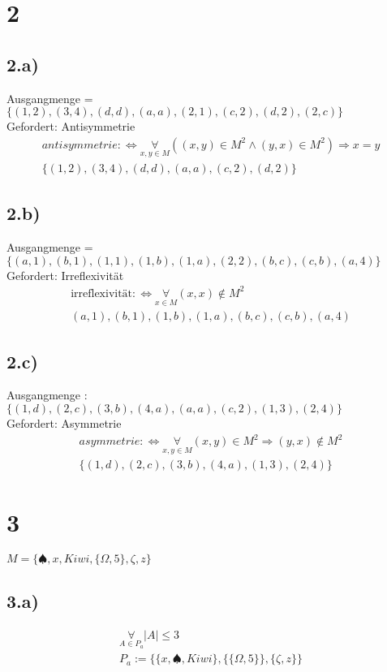 \documentclass[10pt,ngerman]{scrartcl}
\begin{document}
\section{2}
\subsection{2.a)}
Ausgangmenge = $\{(1, 2), (3, 4), (d, d), (a, a), (2, 1), (c, 2), (d, 2), (2, c)\}$\\
Gefordert: Antisymmetrie
\begin{align*}
 antisymmetrie:\Leftrightarrow \underset{x,y \in M}{\forall} ((x,y) \in M^2 \wedge (y,x) \in M^2) \Rightarrow x = y\\
 \{(1, 2), (3, 4), (d, d), (a, a), (c, 2), (d, 2)\}
\end{align*}
\subsection{2.b)}
Ausgangmenge = $\{(a, 1), (b, 1), (1, 1), (1, b), (1, a), (2, 2), (b, c), (c, b), (a, 4)\}$\\
Gefordert: Irreflexivität
\begin{align*}
 \text{irreflexivität} :\Leftrightarrow \underset{x \in M}{\forall} (x,x) \notin M^2\\
 {(a, 1), (b, 1), (1, b), (1, a), (b, c), (c, b), (a, 4)}
\end{align*}
\subsection{2.c)}
Ausgangmenge : $\{(1, d), (2, c), (3, b), (4, a), (a, a), (c, 2), (1, 3), (2, 4)\}$\\
Gefordert: Asymmetrie
\begin{align*}
asymmetrie: \Leftrightarrow \underset{x,y \in M}{\forall} (x,y) \in M^2 \Rightarrow (y,x) \notin M^2\\
 \{(1, d), (2, c), (3, b), (4, a), (1, 3), (2, 4)\}
\end{align*}
\section{3}
$M = \{\spadesuit, x, Kiwi, \{\Omega, 5\}, \zeta, z\}$
\subsection{3.a)}
\begin{align*}
 \underset{A \in P_a}{\forall} |A| \leq 3\\
 P_a := \{\{x,\spadesuit,Kiwi\},\{\{\Omega, 5\}\},\{\zeta,z\}\}
\end{align*}
\end{document}

